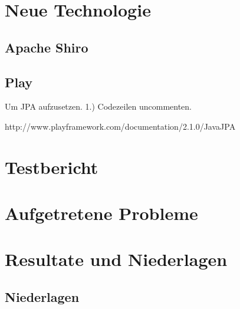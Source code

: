 \documentclass[11pt, a4paper]{article}
\begin{document}
\section{Neue Technologie}

\subsection{Apache Shiro}

\subsection{Play}

Um JPA aufzusetzen.
1.) Codezeilen uncommenten.

http://www.playframework.com/documentation/2.1.0/JavaJPA

\section{Testbericht}
\section{Aufgetretene Probleme}
\section{Resultate und Niederlagen}
\subsection{Niederlagen}
{}

\end{document}
